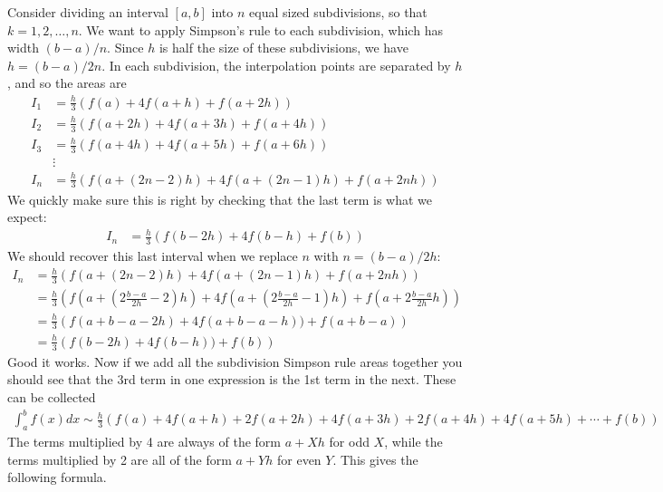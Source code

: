 Consider dividing an interval $[a,b]$ into $n$ equal sized subdivisions, so that $k=1,2,\dots,n$. We want to apply Simpson's rule to each subdivision, which has width $(b-a)/n$. Since $h$ is half the size of these subdivisions, we have $h = (b-a)/2n$. In each subdivision, the interpolation points are separated by $h$, and so the areas are
\begin{align*}
I_1 &= \frac{h}{3}\left( f(a) + 4f(a+h) + f(a+2h) \right) \\
I_2 &= \frac{h}{3}\left( f(a+2h) + 4f(a+3h) + f(a+4h) \right) \\
I_3 &= \frac{h}{3}\left( f(a+4h) + 4f(a+5h) + f(a+6h) \right) \\
&\vdots \\
I_n &= \frac{h}{3}\left( f(a+(2n-2)h) + 4f(a+(2n-1)h) + f(a+2nh) \right)
\end{align*}
We quickly make sure this is right by checking that the last term is what we expect:
\begin{align*}
I_n &= \frac{h}{3}\left( f(b-2h) + 4f(b-h) + f(b) \right)
\end{align*}
We should recover this last interval when we replace $n$ with $n = (b-a)/2h$:
\begin{align*}
I_n &= \frac{h}{3}\left( f(a+(2n-2)h) + 4f(a+(2n-1)h) + f(a+2nh) \right) \\
&= \frac{h}{3}\left( f(a+(2\frac{b-a}{2h}-2)h) + 4f(a+(2\frac{b-a}{2h}-1)h) + f(a+2\frac{b-a}{2h}h) \right) \\
&= \frac{h}{3}\left( f(a+b-a-2h) + 4f(a+b-a -h)) + f(a+b-a) \right) \\
&= \frac{h}{3}\left( f(b-2h) + 4f(b-h)) + f(b) \right)
\end{align*}
Good it works. Now if we add all the subdivision Simpson rule areas together you should see that the 3rd term in one expression is the 1st term in the next. These can be collected
\begin{align*}
\int_a^b f(x)dx \sim \frac{h}{3}\left(f(a) + 4f(a+h) + 2f(a+2h)  + 4f(a+3h) + 2f(a+4h)  + 4f(a+5h) + \cdots + f(b) \right)
\end{align*}
The terms multiplied by 4 are always of the form $a+Xh$ for odd $X$, while the terms multiplied by 2 are all of the form $a+Yh$ for even $Y$. This gives the following formula. \\

